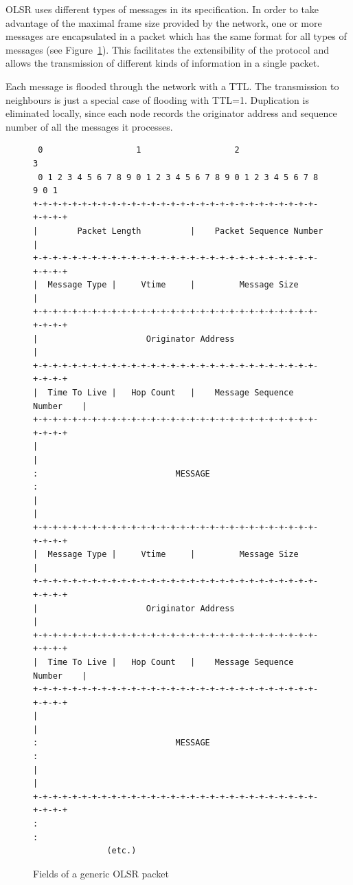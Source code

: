 \documentclass[a4paper,11pt,twoside,openright]{memoir}
\newcommand{\figref}[1] {Figure~\ref{#1}}
\begin{document}
OLSR uses different types of messages in its specification. In order to
take advantage of the maximal frame size provided by the network, one or
more messages are encapsulated in a packet which has the same format for
all types of messages (see \figref{fig:olsr_packet}). This facilitates the extensibility of the
protocol and allows the transmission of different kinds of information
in a single packet.

Each message is flooded through the network with a TTL. The transmission
to neighbours is just a special case of flooding with TTL=1. Duplication is
eliminated locally, since each node records the originator address and
sequence number of all the messages it processes.

\begin{figure}
\begin{verbatim}
 0                   1                   2                   3
 0 1 2 3 4 5 6 7 8 9 0 1 2 3 4 5 6 7 8 9 0 1 2 3 4 5 6 7 8 9 0 1
+-+-+-+-+-+-+-+-+-+-+-+-+-+-+-+-+-+-+-+-+-+-+-+-+-+-+-+-+-+-+-+-+
|        Packet Length          |    Packet Sequence Number     |
+-+-+-+-+-+-+-+-+-+-+-+-+-+-+-+-+-+-+-+-+-+-+-+-+-+-+-+-+-+-+-+-+
|  Message Type |     Vtime     |         Message Size          | 
+-+-+-+-+-+-+-+-+-+-+-+-+-+-+-+-+-+-+-+-+-+-+-+-+-+-+-+-+-+-+-+-+
|                      Originator Address                       |
+-+-+-+-+-+-+-+-+-+-+-+-+-+-+-+-+-+-+-+-+-+-+-+-+-+-+-+-+-+-+-+-+
|  Time To Live |   Hop Count   |    Message Sequence Number    |
+-+-+-+-+-+-+-+-+-+-+-+-+-+-+-+-+-+-+-+-+-+-+-+-+-+-+-+-+-+-+-+-+
|                                                               |
:                            MESSAGE                            :
|                                                               |
+-+-+-+-+-+-+-+-+-+-+-+-+-+-+-+-+-+-+-+-+-+-+-+-+-+-+-+-+-+-+-+-+
|  Message Type |     Vtime     |         Message Size          | 
+-+-+-+-+-+-+-+-+-+-+-+-+-+-+-+-+-+-+-+-+-+-+-+-+-+-+-+-+-+-+-+-+
|                      Originator Address                       |
+-+-+-+-+-+-+-+-+-+-+-+-+-+-+-+-+-+-+-+-+-+-+-+-+-+-+-+-+-+-+-+-+
|  Time To Live |   Hop Count   |    Message Sequence Number    |
+-+-+-+-+-+-+-+-+-+-+-+-+-+-+-+-+-+-+-+-+-+-+-+-+-+-+-+-+-+-+-+-+
|                                                               |
:                            MESSAGE                            :
|                                                               |
+-+-+-+-+-+-+-+-+-+-+-+-+-+-+-+-+-+-+-+-+-+-+-+-+-+-+-+-+-+-+-+-+
:                                                               :
               (etc.)
\end{verbatim}
\caption{Fields of a generic OLSR packet}
\label{fig:olsr_packet}
\end{figure}
\end{document}
